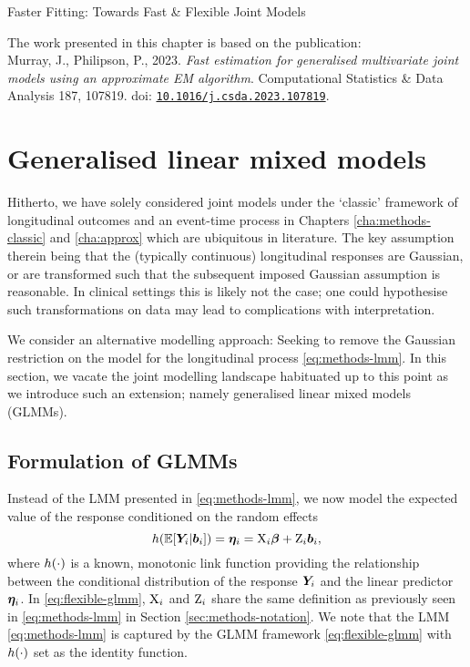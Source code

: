 \begin{chapter}{\label{cha:flexible}Faster Fitting: Towards Fast \& Flexible Joint Models}
\vfill
\begin{center}
    \begin{bluebox}
    The work presented in this chapter is based on the publication:\\Murray, J., Philipson, P., 2023. \textit{Fast estimation for generalised multivariate joint models using an approximate EM algorithm}. Computational Statistics \& Data Analysis 187, 107819. doi: \href{https://doi.org/10.1016/j.csda.2023.107819}{\tt{10.1016/j.csda.2023.107819}}.
    \end{bluebox}
\end{center}
\vfill
\clearpage

\section{Generalised linear mixed models}\label{sec:flexible-glmm-overview}
 Hitherto, we have solely considered joint models under the `classic' framework of longitudinal outcomes and an event-time process in Chapters \ref{cha:methods-classic} and \ref{cha:approx} which are ubiquitous in literature. The key assumption therein being that the (typically continuous) longitudinal responses are Gaussian, or are transformed such that the subsequent imposed Gaussian assumption is reasonable. In clinical settings this is likely not the case; one could hypothesise such transformations on data may lead to complications with interpretation. 
 
 We consider an alternative modelling approach: Seeking to remove the Gaussian restriction on the model for the longitudinal process \eqref{eq:methods-lmm}. In this section, we vacate the joint modelling landscape habituated up to this point as we introduce such an extension; namely generalised linear mixed models (GLMMs). 
 
 \subsection{Formulation of GLMMs}\label{sec:flexible-glmm-formulation}
 Instead of the LMM presented in \eqref{eq:methods-lmm}, we now model the expected value of the response conditioned on the random effects
 \begin{equation}
     h\!\left(\operatorname{\mathbb{E}}\!\left[\bm{Y}_i|\bm{b}_i\right]\right) = \bm{\eta}_i = \mathrm{X}_i\bm{\beta}+\mathrm{Z}_i\bm{b}_i,
 \label{eq:flexible-glmm}    
 \end{equation}
 where $h\!\left(\cdot\right)$ is a known, monotonic link function providing the relationship between the conditional distribution of the response $\bm{Y}_i$ and the linear predictor $\bm{\eta}_i$. In \eqref{eq:flexible-glmm}, $\mathrm{X}_i$ and $\mathrm{Z}_i$ share the same definition as previously seen in \eqref{eq:methods-lmm} in Section \ref{sec:methods-notation}. We note that the LMM \eqref{eq:methods-lmm} is captured by the GLMM framework \eqref{eq:flexible-glmm} with $h\!\left(\cdot\right)$ set as the identity function.
 

\end{chapter}
